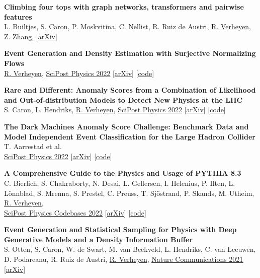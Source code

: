 \documentclass[a4paper,12pt]{article}
\begin{document}
\textbf{Climbing four tops with graph networks, transformers and pairwise features} \\
L. Builtjes, S. Caron, P. Moskvitina, C. Nellist, R. Ruiz de Austri, \underline{R. Verheyen}, Z. Zhang,
[\href{https://arxiv.org/pdf/2211.05143.pdf}{arXiv}]

\textbf{Event Generation and Density Estimation with Surjective Normalizing Flows} \\
\underline{R. Verheyen}, 
\href{https://scipost.org/10.21468/SciPostPhys.13.3.047}{\underline{SciPost Physics 2022}} [\href{https://arxiv.org/abs/2205.01697}{arXiv}] [\href{https://github.com/rbvh/surflows}{code}]

\textbf{Rare and Different: Anomaly Scores from a Combination of Likelihood and Out-of-distribution Models to Detect New Physics at the LHC} \\
S. Caron, L. Hendriks, \underline{R. Verheyen},
\href{https://scipost.org/10.21468/SciPostPhys.12.1.043}{\underline{SciPost Physics 2022}} [\href{https://arxiv.org/pdf/2105.14027.pdf}{arXiv}] [\href{https://github.com/bostdiek/DarkMachines-UnsupervisedChallenge}{code}]

\textbf{The Dark Machines Anomaly Score Challenge: Benchmark Data and Model Independent Event Classification for the Large Hadron Collider} \\
T. Aarrestad et al. \\
\href{https://scipost.org/10.21468/SciPostPhys.12.1.043}{\underline{SciPost Physics 2022}} [\href{https://arxiv.org/pdf/2105.14027.pdf}{arXiv}] [\href{https://github.com/bostdiek/DarkMachines-UnsupervisedChallenge}{code}]

\textbf{A Comprehensive Guide to the Physics and Usage of PYTHIA 8.3} \\
C. Bierlich, S. Chakraborty, N. Desai, L. Gellersen, I. Helenius, P. Ilten, L. Lönnblad, S. Mrenna, S. Prestel, C. Preuss, T. Sjöstrand, P. Skands, M. Utheim, \underline{R. Verheyen}, \\
\href{https://scipost.org/SciPostPhysCodeb.8-r8.3}{\underline{SciPost Physics Codebases 2022}} [\href{https://arxiv.org/abs/2203.11601}{arXiv}] [\href{https://pythia.org}{code}]

\textbf{Event Generation and Statistical Sampling for Physics with Deep Generative Models and a Density Information Buffer} \\
S. Otten, S. Caron, W. de Swart, M. van Beekveld, L. Hendriks, C. van Leeuwen, D. Podareanu, R. Ruiz de Austri, \underline{R. Verheyen}, 
\href{https://www.nature.com/articles/s41467-021-22616-z}{\underline{Nature Communications 2021}} [\href{https://arxiv.org/abs/1901.00875}{arXiv}]
\end{document}
